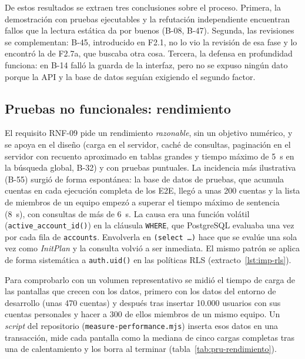 De estos resultados se extraen tres conclusiones sobre el proceso. Primera,
la demostración con pruebas ejecutables y la refutación independiente
encuentran fallos que la lectura estática da por buenos (B-08, B-47).
Segunda, las revisiones se complementan: B-45, introducido en F2.1, no lo vio
la revisión de esa fase y lo encontró la de F2.7a, que buscaba otra cosa.
Tercera, la defensa en profundidad funciona: en B-14 falló la guarda de la
interfaz, pero no se expuso ningún dato porque la API y la base de datos
seguían exigiendo el segundo factor.

\subsection{Pruebas no funcionales: rendimiento}
\label{sec:pru-rendimiento}

El requisito RNF-09 pide un rendimiento \emph{razonable}, sin un objetivo
numérico, y se apoya en el diseño (carga en el servidor,
caché de consultas, paginación en el servidor con recuento aproximado en
tablas grandes y tiempo máximo de 5~s en la búsqueda global, B-32) y con
pruebas puntuales. La incidencia más ilustrativa (B-55) surgió de forma
espontánea: la base de datos de pruebas, que acumula cuentas en cada
ejecución completa de los E2E, llegó a unas 200 cuentas y la lista de
miembros de un equipo empezó a superar el tiempo máximo de sentencia (8~s),
con consultas de más de 6~s. La causa era una función volátil
(\texttt{active\_account\_id()}) en la cláusula \texttt{WHERE}, que PostgreSQL
evaluaba una vez por cada fila de \texttt{accounts}. Envolverla en
\texttt{(select \ldots)} hace que se evalúe una sola vez como
\textit{InitPlan} y la consulta volvió a ser inmediata. El mismo patrón se
aplica de forma sistemática a \texttt{auth.uid()} en las políticas RLS
(extracto~\ref{lst:imp-rls}).

Para comprobarlo con un volumen representativo se midió el tiempo de carga
de las pantallas que crecen con los datos, primero con los datos del entorno
de desarrollo (unas 470 cuentas) y después tras insertar 10.000 usuarios con
sus cuentas personales y hacer a 300 de ellos miembros de un mismo equipo. Un
\textit{script} del repositorio (\texttt{measure-performance.mjs}) inserta
esos datos en una transacción, mide cada pantalla como la mediana de cinco
cargas completas tras una de calentamiento y los borra al terminar
(tabla~\ref{tab:pru-rendimiento}).

